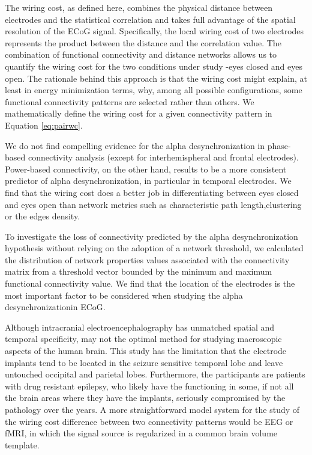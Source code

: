 \documentclass[11pt, onecolumn]{article}
\begin{document}
The wiring cost, as defined here, combines the physical distance between electrodes and the statistical correlation and takes full advantage of the spatial resolution of the ECoG signal. Specifically, the local wiring cost of two electrodes represents the product between the distance and the correlation value. The combination of functional connectivity and distance networks allows us to quantify the wiring cost for the two conditions under study -eyes closed and eyes open.
The rationale behind this approach is that the wiring cost might explain, at least in energy minimization terms, why, among all possible configurations, some functional connectivity patterns are selected rather than others. We mathematically define the wiring cost for a given connectivity pattern in Equation \ref{eq:pairwc}. 

We do not find compelling evidence for 
the alpha desynchronization in phase-based connectivity analysis (except for interhemispheral and frontal electrodes). Power-based connectivity, on the other hand, results to be a more consistent predictor of alpha desynchronization, in particular in temporal electrodes. We find that the wiring cost does a better job in differentiating between eyes closed and eyes open than network metrics such as characteristic path length,clustering or the edges density.

To investigate the loss of connectivity predicted by the alpha desynchronization hypothesis without relying on the adoption of a network threshold, we calculated the distribution of network properties values associated with the connectivity matrix from a threshold vector bounded by the minimum and maximum functional connectivity value.
We find that the location of the electrodes is the most important factor to be considered when studying the alpha 
desynchronizationin ECoG.

Although intracranial electroencephalography has unmatched spatial and temporal specificity, may not the optimal method for studying macroscopic aspects of the human brain. This study has the limitation that the electrode implants tend to be located in the seizure sensitive temporal lobe and leave untouched occipital and parietal lobes. Furthermore, the participants are patients with drug resistant epilepsy, who likely have the functioning in some, if not all the brain areas where they have the implants, seriously compromised by the pathology over the years. A more straightforward model system for the study of the wiring cost difference between two connectivity patterns would be EEG or fMRI, in which the signal source is regularized in a common brain volume template. 
\end{document}
